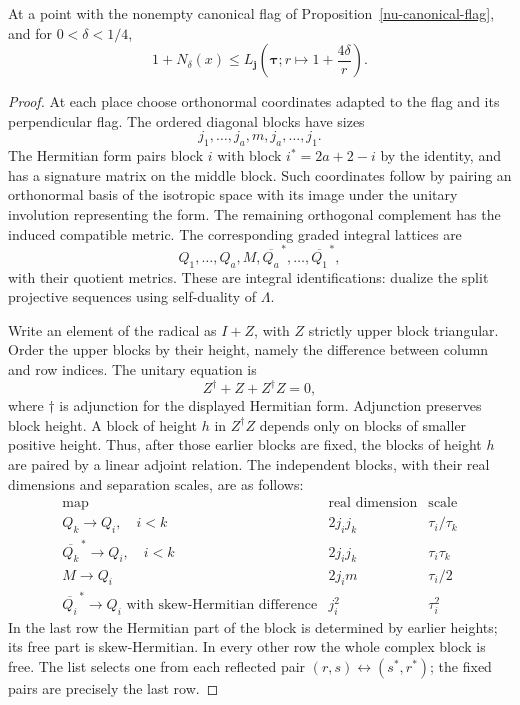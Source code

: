 \begin{lemma}\label{nu-packing}
At a point with the nonempty canonical flag
of Proposition~\ref{nu-canonical-flag}, and for
$0<\delta<1/4$,
\begin{equation}\label{nu-packing-bound}
 1+N_\delta(x)\le
 L_{\mathbf j}\!\left(\boldsymbol\tau;
                         r\longmapsto1+\frac{4\delta}{r}\right).
\end{equation}
\end{lemma}
\begin{proof}
At each place choose orthonormal coordinates
adapted to the flag and its perpendicular flag.
The ordered diagonal blocks have sizes
\[
                j_1,\ldots,j_a,m,j_a,\ldots,j_1.
\]
The Hermitian form pairs block $i$ with block
$i^*=2a+2-i$ by the identity, and has a
signature matrix on the middle block.
Such coordinates follow by pairing an orthonormal
basis of the isotropic space with its image under
the unitary involution representing the form.
The remaining orthogonal complement has the
induced compatible metric.
The corresponding graded integral lattices are
\[
              Q_1,\ldots,Q_a,M,
                   \overline{Q_a}^{\,*},\ldots,
                   \overline{Q_1}^{\,*},
\]
with their quotient metrics.  These are integral
identifications: dualize the split projective
sequences using self-duality of $\Lambda$.

Write an element of the radical as $I+Z$, with
$Z$ strictly upper block triangular.  Order the
upper blocks by their height, namely the difference
between column and row indices.  The unitary
equation is
\[
              Z^\dagger+Z+Z^\dagger Z=0,
\]
where $\dagger$ is adjunction for the displayed
Hermitian form.  Adjunction preserves block
height.  A block of height $h$ in
$Z^\dagger Z$ depends only on blocks of smaller
positive height.  Thus, after those earlier
blocks are fixed, the blocks of height $h$ are
paired by a linear adjoint relation.  The
independent blocks, with their real dimensions
and separation scales, are as follows:
\[
\begin{array}{c|c|c}
 \text{map}&\text{real dimension}&\text{scale}\\ \hline
 Q_k\longrightarrow Q_i,\quad i<k
       &2j_ij_k&\tau_i/\tau_k\\
 \overline{Q_k}^{\,*}\longrightarrow Q_i,\quad i<k
       &2j_ij_k&\tau_i\tau_k\\
 M\longrightarrow Q_i
       &2j_im&\tau_i/2\\
 \overline{Q_i}^{\,*}\longrightarrow Q_i
       \text{ with skew-Hermitian difference}
       &j_i^2&\tau_i^2
\end{array}
\]
In the last row the Hermitian part of the block
is determined by earlier heights; its free part
is skew-Hermitian.  In every other row the whole
complex block is free.  The list selects one
from each reflected pair
$(r,s)\leftrightarrow(s^*,r^*)$; the fixed pairs
are precisely the last row.


\end{proof}
